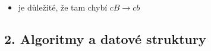 \begin{itemize}
\begin{itemize}
\begin{itemize}
\begin{itemize}
\end{itemize}
\item $aB\to ab$ \dots{} začátek přepisu $B$ na $b$
\item $bB\to bb$ \dots{} pokračování přepisu $B$ na $b$
\item $bC\to bc$ \dots{} začátek přepisu $C$ na $c$
\item $cC\to cc$ \dots{} pokračování přepisu $C$ na $c$
\end{itemize}
\item je důležité, že tam chybí $cB\to cb$
\end{itemize}
\end{itemize}
\subsection{2. Algoritmy a datové struktury}
